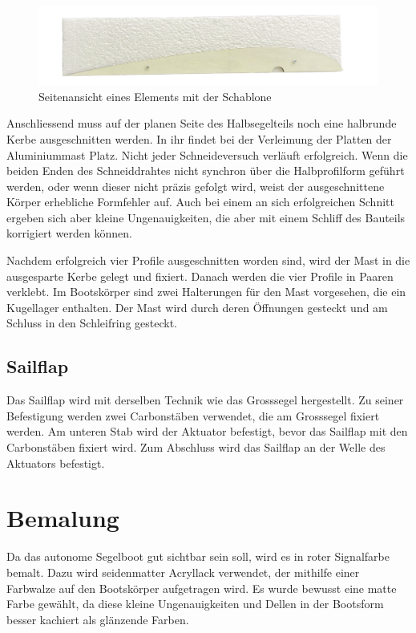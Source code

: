 \begin{figure}[H]
    \centering
    \includegraphics[width=1\linewidth]{assets/template_on_foam.png}
    
    \caption{Seitenansicht eines Elements mit der Schablone}
    \label{fig:enter-label}
\end{figure}

Anschliessend muss auf der planen Seite des Halbsegelteils noch eine halbrunde Kerbe ausgeschnitten werden. In ihr findet bei der Verleimung der Platten der Aluminiummast Platz. Nicht jeder Schneideversuch verläuft erfolgreich. Wenn die beiden Enden des Schneiddrahtes nicht synchron über die Halbprofilform geführt werden, oder wenn dieser nicht präzis gefolgt wird, weist der ausgeschnittene Körper erhebliche Formfehler auf. Auch bei einem an sich erfolgreichen Schnitt ergeben sich aber kleine Ungenauigkeiten, die aber mit einem Schliff des Bauteils korrigiert werden können. 

Nachdem erfolgreich vier Profile ausgeschnitten worden sind, wird der Mast in die ausgesparte Kerbe gelegt und fixiert. Danach werden die vier Profile in Paaren verklebt. Im Bootskörper sind zwei Halterungen für den Mast vorgesehen, die ein Kugellager enthalten. Der Mast wird durch deren Öffnungen gesteckt und am Schluss in den Schleifring gesteckt.
\subsection{Sailflap}
Das Sailflap wird mit derselben Technik wie das Grosssegel hergestellt. Zu seiner Befestigung werden zwei Carbonstäben verwendet, die am Grosssegel fixiert werden. Am unteren Stab wird der Aktuator befestigt, bevor das Sailflap mit den Carbonstäben fixiert wird. Zum Abschluss wird das Sailflap an der Welle des Aktuators befestigt.   
\section{Bemalung}
Da das autonome Segelboot gut sichtbar sein soll, wird es in roter Signalfarbe bemalt. Dazu wird seidenmatter Acryllack verwendet, der mithilfe einer Farbwalze auf den Bootskörper aufgetragen wird. Es wurde bewusst  eine matte Farbe  gewählt, da diese kleine Ungenauigkeiten und Dellen in der Bootsform besser kachiert als glänzende Farben. 

